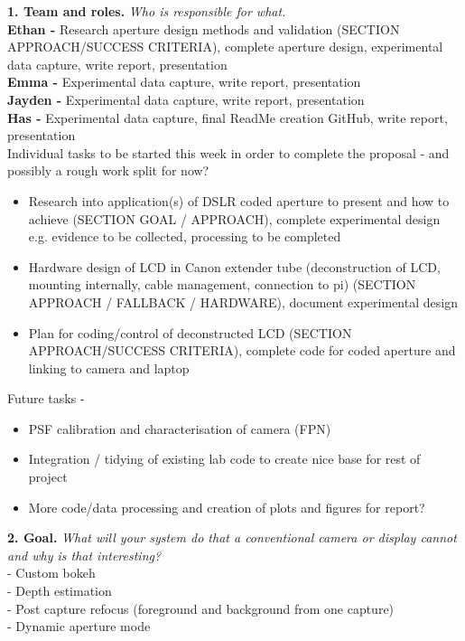 \vspace{0.5em}
\noindent\textbf{1. Team and roles.} \textit{Who is responsible for what.}\\
\textbf{Ethan - } Research aperture design methods and validation (SECTION APPROACH/SUCCESS CRITERIA), complete aperture design, experimental data capture, write report, presentation \\
\textbf{Emma - } Experimental data capture, write report, presentation \\
\textbf{Jayden - } Experimental data capture, write report, presentation \\
\textbf{Has - } Experimental data capture, final ReadMe creation GitHub, write report, presentation \\

Individual tasks to be started this week in order to complete the proposal - and possibly a rough work split for now?
\begin{itemize}
    \item Research into application(s) of DSLR coded aperture to present and how to achieve (SECTION GOAL / APPROACH), complete experimental design e.g. evidence to be collected, processing to be completed 
    \item Hardware design of LCD in Canon extender tube (deconstruction of LCD, mounting internally, cable management, connection to pi) (SECTION APPROACH / FALLBACK / HARDWARE), document experimental design
    \item Plan for coding/control of deconstructed LCD (SECTION APPROACH/SUCCESS CRITERIA), complete code for coded aperture and linking to camera and laptop 
\end{itemize}

Future tasks - 
\begin{itemize}
    \item PSF calibration and characterisation of camera (FPN) 
    \item Integration / tidying of existing lab code to create nice base for rest of project 
    \item More code/data processing and creation of plots and figures for report?
\end{itemize}

\vspace{0.5em}
\noindent\textbf{2. Goal.} \textit{What will your system do that a conventional camera or display cannot and why is that interesting?}\\

- Custom bokeh \\
- Depth estimation \\
- Post capture refocus (foreground and background from one capture) \\
- Dynamic aperture mode \\

